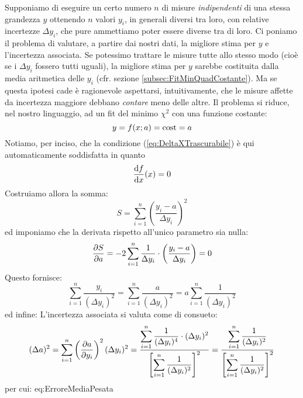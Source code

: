 Supponiamo di eseguire un certo numero $n$ di misure {\itshape indipendenti}
di una stessa grandezza $y$ ottenendo $n$ valori $y_i$, in generali diversi
tra loro, con relative incertezze $\Delta y_i$, che pure ammettiamo poter
essere diverse tra di loro.
Ci poniamo il problema di valutare, a partire dai nostri dati,
la migliore stima per $y$ e l'incertezza associata.
Se potessimo trattare le misure tutte allo stesso modo (cio\`e se i
$\Delta y_i$
fossero tutti uguali), la migliore stima per $y$ sarebbe costituita dalla
media aritmetica delle $y_i$ (cfr. sezione \ref{subsec:FitMinQuadCostante}).
Ma se questa ipotesi cade \`e ragionevole aspettarsi, intuitivamente,
che le misure affette da incertezza maggiore debbano {\itshape contare}
meno delle altre.
Il problema si riduce, nel nostro linguaggio, ad un fit del minimo $\chi^2$
con una funzione costante:
$$
y = f(x; a)={\rm cost}=a
$$
Notiamo, per inciso, che la condizione (\ref{eq:DeltaXTrascurabile})
\`e qui automaticamente soddisfatta in quanto
$$
\displaystyle \frac{\mathrm{d} f}{\mathrm{d} x}({x}) = 0
$$
Costruiamo allora la somma:
$$
S = \sum_{i=1}^{n}\left(\frac{y_i-a}{\Delta y_i}\right)^2
$$
ed imponiamo che la derivata rispetto all'unico parametro sia nulla:
$$
\displaystyle \frac{\partial S}{\partial a}=-2 \sum_{i=1}^{n} \frac{1}{\Delta y_i} \cdot
\left(\frac{y_i-a}{\Delta y_i}\right) = 0
$$
Questo fornisce:
$$
\sum_{i=1}^{n} \frac{y_i}{(\Delta y_i)^2} =
\sum_{i=1}^{n} \frac{a}{(\Delta y_i)^2} =
a \sum_{i=1}^{n} \frac{1}{(\Delta y_i)^2}
$$
ed infine:
L'incertezza associata si valuta come di consueto:
$$
(\Delta a)^2 = \sum_{i=1}^{n} \left(\displaystyle \frac{\partial a}{\partial y_i}\right)^2 (\Delta y_i)^2 =
\frac{\displaystyle \sum_{i=1}^{n} \frac{1}{(\Delta y_i)^4}
\cdot (\Delta y_i)^2}
{\displaystyle \left[ \sum_{i=1}^{n} \frac{1}{(\Delta y_i)^2} \right]^2}=
\frac{\displaystyle \sum_{i=1}^{n} \frac{1}{(\Delta y_i)^2}}
{\displaystyle \left[ \sum_{i=1}^{n} \frac{1}{(\Delta y_i)^2} \right]^2}
$$
per cui:
{eq:ErroreMediaPesata}

